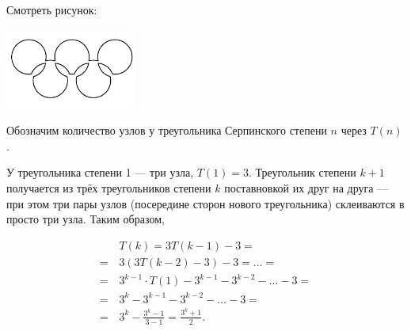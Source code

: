 
\begin{itemize}
\itA Смотреть рисунок:

\begin{multicols}{2}

\begin{center}
	\includegraphics[width=4.4cm]{figures/2018-serpinsky-a}
\end{center}

\columnbreak

\begin{center}  \end{center}

\end{multicols}


\itB Обозначим количество узлов у треугольника Серпинского степени $n$ через $T(n)$.

У треугольника степени 1 — три узла, $T(1)=3$. Треугольник степени $k+1$ получается из  трёх треугольников степени $k$ поставновкой их друг на друга — при этом три пары узлов (посередине сторон нового треугольника) склеиваются в просто три узла. Таким образом,

\begin{align*}
	& T(k) = 3T(k-1) - 3 =\\
	=\, & 3(3T(k-2)-3)-3 = \ldots = \\
	=\, & 3^{k-1}\cdot T(1) - 3^{k-1} - 3^{k-2} - \ldots - 3 = \\
	=\, & 3^k - 3^{k-1} - 3^{k-2} - \ldots - 3 = \\
	=\, & 3^k - \frac{3^k-1}{3-1} = \frac{3^k+1}{2}. \\
\end{align*}


\end{itemize}

